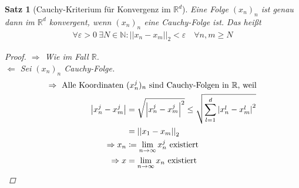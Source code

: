 \documentclass[11pt, twoside, a4paper]{article}
\theoremstyle{plain}
\newtheorem{satz}[blockelement]{Satz}
\newcommand{\abs}[1]{\left|#1\right|}
\newcommand{\norm}[1]{\abs{\abs{#1}}}
\newcommand{\impl}[0]{\Rightarrow{}}
\newcommand{\definedas}[0]{\coloneqq}
\newcommand{\anf}[1]{\glqq{}#1\grqq}
\newcommand{\fromto}{\rightarrow{}}
\newcommand{\naturalnumbers}{\mathbb{N}}
\newcommand{\realnumbers}{\mathbb{R}}
\newcommand{\ntoinfty}[0]{n\fromto\infty}
\begin{document}
    \begin{satz}[Cauchy-Kriterium für Konvergenz im $\realnumbers^d$]
        Eine Folge $(x_n)_n$ ist genau dann im $\realnumbers^d$ konvergent, wenn $(x_n)_n$ eine Cauchy-Folge ist. Das heißt
        \begin{align*}
            \forall\varepsilon > 0~\exists N\in\naturalnumbers\colon \norm{x_n-x_m}_2 < \varepsilon\quad\forall n,m\geq N
        \end{align*}

        \begin{proof}
            \anf{$\impl$} Wie im Fall $\realnumbers$.\\
            \anf{$\Leftarrow$} Sei $(x_n)_n$ Cauchy-Folge.
            \begin{align*}
                \impl\text{ Alle Koordinaten } &(x_n^j)_n\text{ sind Cauchy-Folgen in }\realnumbers\text{, weil}\\
                \abs{x_n^j-x_m^j} &= \sqrt {\abs{x_n^j-x_m^j}^2} \leq \sqrt {\sum_{l=1}^{d} \abs{x_n^l - x_m^l}^2}\\
                &= \norm{x_1-x_m}_2\\
                \impl x_n &\definedas \lim_{\ntoinfty} x_n^j\text{ existiert}\\
                \impl x &= \lim_{\ntoinfty} x_n\text{ existiert}\qedhere
            \end{align*}
        \end{proof}


\end{satz}
\end{document}
